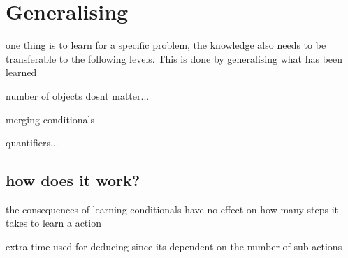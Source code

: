 \section{Generalising}	
	one thing is to learn for a specific problem, the knowledge also needs to be transferable to the following levels. This is done by generalising what has been learned
	
	
	number of objects dosnt matter...
	
	
	merging conditionals
	
	quantifiers...
	
	
	
\subsection{how does it work?}	
	
	the consequences of learning conditionals have no effect on how many steps it takes to learn a action
	
	extra time used for deducing since its dependent on the number of sub actions
